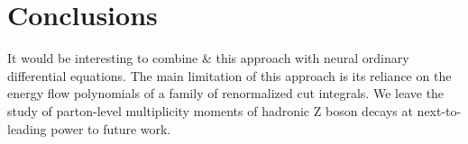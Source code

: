 \section{Conclusions}\label{sec:conclusions}

It would be interesting to combine & this approach with neural ordinary
differential equations. The main limitation of this approach is its
reliance on the energy flow polynomials of a family of renormalized cut
integrals. We leave the study of parton-level multiplicity moments of
hadronic Z boson decays at next-to-leading power to future work.

